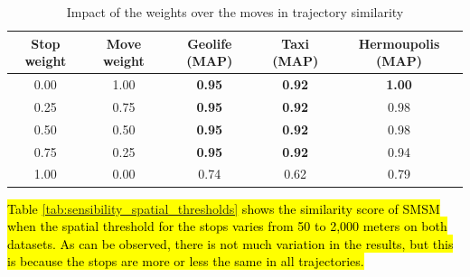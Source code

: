 \documentclass[12pt]{article}
\begin{document}
\begin{table}[ht!]
  \scriptsize
  \centering
  \begin{tabular}{|c|c|c|c|c|}
  	\hline
Stop weight & Move weight & Geolife (MAP) & Taxi (MAP) & Hermoupolis (MAP) \\
  	\hline
0.00 & 1.00 & \textbf{0.95} & \textbf{0.92} & \textbf{1.00}\\
0.25 & 0.75 & \textbf{0.95} & \textbf{0.92} & 0.98\\
0.50 & 0.50 & \textbf{0.95} & \textbf{0.92} & 0.98\\
0.75 & 0.25 & \textbf{0.95} & \textbf{0.92} & 0.94\\
1.00 & 0.00 & 0.74 & 0.62 & 0.79 \\
    \hline
  \end{tabular}
  \caption{Impact of the weights over the moves in trajectory similarity}
  \label{tab:sensibility_stopmove}
\end{table}

\hl{Table {\ref{tab:sensibility_spatial_thresholds}} shows the similarity score of SMSM when the spatial threshold for the stops varies from 50 to 2,000 meters on both datasets. As can be observed, there is not much variation in the results, but this is because the stops are more or less the same in all trajectories.}


\end{document}
